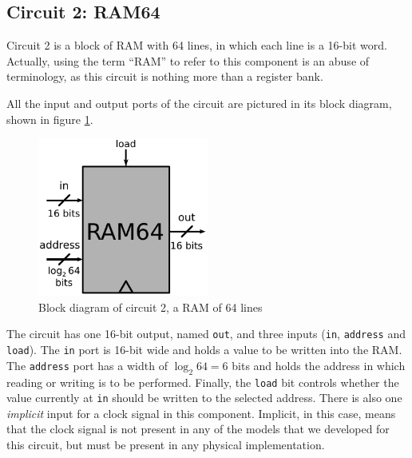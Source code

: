 \documentclass[a4paper]{article}
\begin{document}


        \subsection{Circuit 2: RAM64}
        \label{subsec:ram-circuit}
            Circuit 2 is a block of RAM with 64 lines, in which each line is a 16-bit word.
            Actually, using the term ``RAM'' to refer to this component is an abuse of terminology,
            as this circuit is nothing more than a register bank.

            All the input and output ports of the circuit are pictured in its block diagram, shown
            in figure \ref{fig:ram-block}.
            \begin{figure}[h!]
                \begin{center}
                    \includegraphics[width=0.5\textwidth]{imgs/ram-block.pdf}
                \end{center}
                \caption{Block diagram of circuit 2, a RAM of 64 lines
                    \label{fig:ram-block}}
            \end{figure}

            The circuit has one 16-bit output, named \texttt{out}, and three inputs (\texttt{in},
            \texttt{address} and \texttt{load}). The \texttt{in} port is 16-bit wide and holds a
            value to be written into the RAM. The \texttt{address} port has a width of $\log_{2} 64
            = 6$ bits and holds the address in which reading or writing is to be performed. Finally,
            the \texttt{load} bit controls whether the value currently at \texttt{in} should be
            written to the selected address. There is also one \emph{implicit} input for a clock
            signal in this component.  Implicit, in this case, means that the clock signal is not
            present in any of the models that we developed for this circuit, but must be present in
            any physical implementation.
\end{document}

